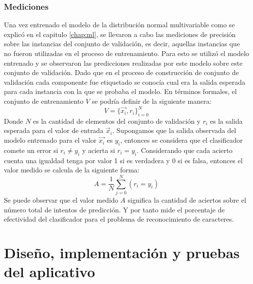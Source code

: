 \documentclass[a4paper, 11pt, oneside]{report}
\begin{document}
\subsection{Mediciones}
Una vez entrenado el modelo de la distribución normal multivariable como se explicó en el capitulo \ref{chap:ml}, se llevaron a cabo las mediciones de precisión sobre las instancias del conjunto de validación, es decir, aquellas instancias que no fueron utilizadas en el proceso de entrenamiento. Para esto se utilizó el modelo entrenado y se observaron las predicciones realizadas por este modelo sobre este conjunto de validación. Dado que en el proceso de construcción de conjunto de validación cada componente fue etiquetado se conocía cual era la salida esperada para cada instancia con la que se probaba el modelo. En términos formales, el conjunto de entrenamiento $V$ se podría definir de la siguiente manera:
\[ V = \{\vec{x_i},r_i\}_{i=0}^N \]
Donde $N$ es la cantidad de elementos del conjunto de validación y $r_i$ es la salida esperada para el valor de entrada $\vec{x}_i$. Supongamos que la salida observada del modelo entrenado para el valor $\vec{x_i}$ es $y_i$, entonces se considera que el clasificador comete un error si $r_i \ne y_i$ y acierta si $r_i = y_i$. Considerando que cada acierto cuenta una igualdad tenga por valor 1 si es verdadera y 0 si es falsa, entonces el valor medido se calcula de la siguiente forma:
\[ A = \frac{1}{N} \sum_{j=0}^{N}(r_i=y_i) \]
Se puede observar que el valor medido $A$ significa la cantidad de aciertos sobre el número total de intentos de predicción. Y por tanto mide el porcentaje de efectividad del clasificador para el problema de reconocimiento de caracteres.
\chapter{Diseño, implementación y pruebas del aplicativo}
\label{chap:ingSw}
\end{document}

